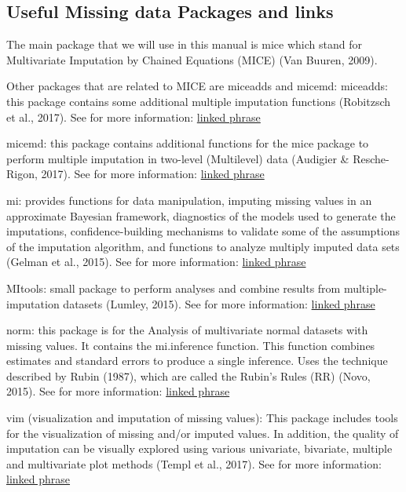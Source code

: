 \documentclass[]{book}
\begin{document}
\subsection{Useful Missing data Packages and
links}\label{useful-missing-data-packages-and-links}

The main package that we will use in this manual is mice which stand for
Multivariate Imputation by Chained Equations (MICE) (Van Buuren, 2009).

Other packages that are related to MICE are miceadds and micemd:
miceadds: this package contains some additional multiple imputation
functions (Robitzsch et al., 2017). See for more information:
\href{https://cran.r-project.org/web/packages/miceadds/index.html}{linked
phrase}

micemd: this package contains additional functions for the mice package
to perform multiple imputation in two-level (Multilevel) data (Audigier
\& Resche-Rigon, 2017). See for more information:
\href{https://cran.r-project.org/web/packages/micemd/index.html}{linked
phrase}

mi: provides functions for data manipulation, imputing missing values in
an approximate Bayesian framework, diagnostics of the models used to
generate the imputations, confidence-building mechanisms to validate
some of the assumptions of the imputation algorithm, and functions to
analyze multiply imputed data sets (Gelman et al., 2015). See for more
information:
\href{https://cran.r-project.org/web/packages/mi/index.html}{linked
phrase}

MItools: small package to perform analyses and combine results from
multiple-imputation datasets (Lumley, 2015). See for more information:
\href{https://cran.r-project.org/web/packages/mitools/index.html}{linked
phrase}

norm: this package is for the Analysis of multivariate normal datasets
with missing values. It contains the mi.inference function. This
function combines estimates and standard errors to produce a single
inference. Uses the technique described by Rubin (1987), which are
called the Rubin's Rules (RR) (Novo, 2015). See for more information:
\href{https://cran.r-project.org/web/packages/norm/index.html}{linked
phrase}

vim (visualization and imputation of missing values): This package
includes tools for the visualization of missing and/or imputed values.
In addition, the quality of imputation can be visually explored using
various univariate, bivariate, multiple and multivariate plot methods
(Templ et al., 2017). See for more information:
\href{https://cran.r-project.org/web/packages/mi/index.html}{linked
phrase}
\end{document}
